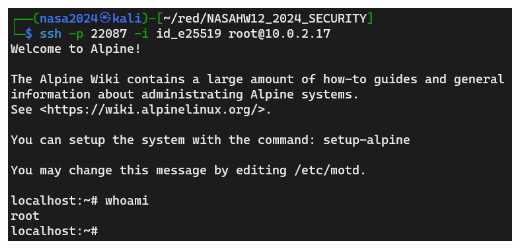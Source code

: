 \documentclass[12pt, a4paper]{article}
\begin{document}
\begin{enumerate}[label=(\alph*)]
    \includegraphics[width=\linewidth]{1-e_result.png}
  \end{enumerate}
\end{document}
